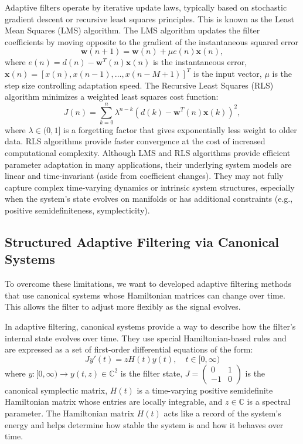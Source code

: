 \documentclass[reqno]{amsart}
\numberwithin{equation}{section}
\begin{document}
Adaptive filters operate by iterative update laws, typically based on stochastic gradient descent or recursive least squares principles. This is known as the Least Mean Squares (LMS) algorithm. The LMS algorithm updates the filter coefficients by moving opposite to the gradient of the instantaneous squared error
\begin{equation}
\mathbf{w}(n+1) = \mathbf{w}(n) + \mu e(n) \mathbf{x}(n),
\end{equation}
where \( e(n) = d(n) - \mathbf{w}^T(n) \mathbf{x}(n) \) is the instantaneous error,
\( \mathbf{x}(n) = [x(n), x(n-1), \ldots, x(n - M + 1)]^T \) is the input vector,
 \( \mu \) is the step size controlling adaptation speed. The Recursive Least Squares (RLS) algorithm minimizes a weighted least squares cost function:
\begin{equation}
J(n) = \sum_{k=0}^n \lambda^{n-k} \left( d(k) - \mathbf{w}^T(n) \mathbf{x}(k) \right)^2,
\end{equation}
where \( \lambda \in (0,1] \) is a forgetting factor that gives exponentially less weight to older data. RLS algorithms provide faster convergence at the cost of increased computational complexity. Although LMS and RLS algorithms provide efficient parameter adaptation in many applications, their underlying system models are linear and time-invariant (aside from coefficient changes). They may not fully capture complex time-varying dynamics or intrinsic system structures, especially when the system's state evolves on manifolds or has additional constraints (e.g., positive semidefiniteness, symplecticity).

\subsection{Structured Adaptive Filtering via Canonical Systems}

To overcome these limitations, we want to developed adaptive filtering methods that use canonical systems whose Hamiltonian matrices can change over time. This allows the filter to adjust more flexibly as the signal evolves.

In adaptive filtering, canonical systems provide a way to describe how the filter's internal state evolves over time. They use special Hamiltonian-based rules and are expressed as a set of first-order differential equations of the form:
\begin{equation}\label{ca}
J  y'(t) = z H(t) y(t), \quad t\in [0, \infty)
\end{equation}
where   \( y : [0, \infty) \rightarrow y(t, z) \in \mathbb{C}^2 \) is the filter state,
   \( J = \begin{pmatrix} 0 & 1 \\ -1 & 0 \end{pmatrix} \) is the canonical symplectic matrix,
   \( H(t)\) is a time-varying positive semidefinite Hamiltonian matrix whose entries are locally integrable, and 
 \( z \in \mathbb{C} \) is a spectral parameter.
The Hamiltonian matrix $H(t)$ acts like a record of the system's energy and helps determine how stable the system is and how it behaves over time.
\end{document}
